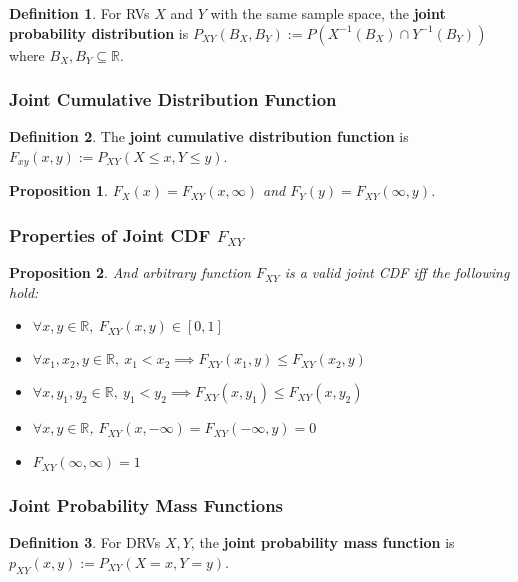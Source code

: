 \documentclass[12pt]{article}
\newtheorem*{prop*}{Proposition}
\theoremstyle{definition}
\newtheorem{defn}{Definition}[subsection]
\newcommand{\R}{\mathbb{R}}
\begin{document}
\begin{defn}
  For RVs $X$ and $Y$ with the same sample space, the \textbf{joint probability distribution} is $P_{XY}(B_X, B_Y) := P(X^{-1}(B_X) \cap Y^{-1}(B_Y))$ where $B_X, B_Y \subseteq \R$.
\end{defn}

\subsubsection{Joint Cumulative Distribution Function}

\begin{defn}
  The \textbf{joint cumulative distribution function} is\\ $F_{xy}(x, y) := P_{XY}(X \leq x, Y \leq y)$.
\end{defn}

\begin{prop*}
  $F_X(x) = F_{XY}(x, \infty)$ and $F_Y(y) = F_{XY}(\infty, y)$.
\end{prop*}

\subsubsection{Properties of Joint CDF $F_{XY}$}

\begin{prop*}
  And arbitrary function $F_{XY}$ is a valid joint CDF iff the following hold:
  \begin{itemize}
    \item $\forall x, y \in \R,\ F_{XY}(x, y) \in [0, 1]$
    \item $\forall x_1, x_2, y \in \R,\ x_1 < x_2 \implies F_{XY}(x_1, y) \leq F_{XY}(x_2, y)$
    \item $\forall x, y_1, y_2 \in \R,\ y_1 < y_2 \implies F_{XY}(x, y_1) \leq F_{XY}(x, y_2)$
    \item $\forall x, y \in \R$, $F_{XY}(x, -\infty) = F_{XY}(-\infty, y) = 0$
    \item $F_{XY}(\infty, \infty) = 1$
  \end{itemize}
\end{prop*}

\subsubsection{Joint Probability Mass Functions}

\begin{defn}
  For DRVs $X, Y$, the \textbf{joint probability mass function} is\\ $p_{XY}(x, y) := P_{XY}(X = x, Y = y)$.
\end{defn}
\end{document}

